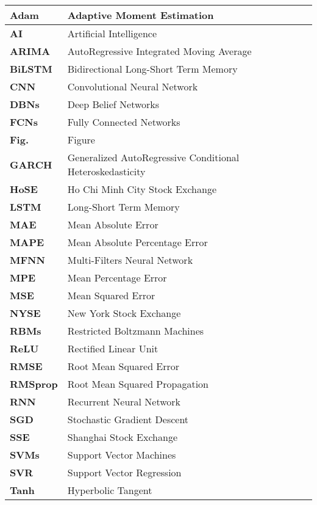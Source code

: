 \documentclass[a4paper]{article}
\begin{document}
\begin{spacing}{1.5}
    \begin{tabular}{|l|l|}
    \hline
        \textbf{Adam} & Adaptive Moment Estimation \\ \hline
        \textbf{AI} & Artificial Intelligence \\ \hline
        \textbf{ARIMA} & AutoRegressive Integrated Moving Average \\ \hline
        \textbf{BiLSTM} & Bidirectional Long-Short Term Memory \\ \hline
        \textbf{CNN} & Convolutional Neural Network \\ \hline
        \textbf{DBNs} & Deep Belief Networks \\ \hline
        \textbf{FCNs} & Fully Connected Networks \\ \hline
        \textbf{Fig.} & Figure \\ \hline
        \textbf{GARCH} & Generalized AutoRegressive Conditional Heteroskedasticity \\ \hline
        \textbf{HoSE} & Ho Chi Minh City Stock Exchange \\ \hline
        \textbf{LSTM} & Long-Short Term Memory \\ \hline
        \textbf{MAE} & Mean Absolute Error \\ \hline
        \textbf{MAPE} & Mean Absolute Percentage Error \\ \hline
        \textbf{MFNN} & Multi-Filters Neural Network \\ \hline
        \textbf{MPE} & Mean Percentage Error \\ \hline
        \textbf{MSE} & Mean Squared Error \\ \hline
        \textbf{NYSE} & New York Stock Exchange \\ \hline
        \textbf{RBMs} & Restricted Boltzmann Machines \\ \hline
        \textbf{ReLU} & Rectified Linear Unit \\ \hline
        \textbf{RMSE} & Root Mean Squared Error \\ \hline
        \textbf{RMSprop} & Root Mean Squared Propagation \\ \hline
        \textbf{RNN} & Recurrent Neural Network \\ \hline
        \textbf{SGD} & Stochastic Gradient Descent \\ \hline
        \textbf{SSE} & Shanghai Stock Exchange \\ \hline
        \textbf{SVMs} & Support Vector Machines \\ \hline
        \textbf{SVR} & Support Vector Regression \\ \hline
        \textbf{Tanh} & Hyperbolic Tangent \\ \hline
    \end{tabular}
\end{spacing}
\end{document}
